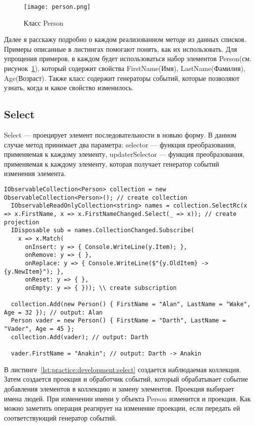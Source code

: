\begin{figure}[ht]
\centering
  \texttt{[image: person.png]}
  \caption{ Класс Person }
  \label{fig:person}
\end{figure}

Далее я расскажу подробно о каждом реализованном методе из данных списков.
Примеры описанные в листингах помогают понять, как их использовать.
Для упрощения примеров, в каждом будет использоваться набор элементов Person(см. рисунок~\ref{fig:person}), который содержит свойства FirstName(Имя), LastName(Фамилия), Age(Возраст).
Также класс содержит генераторы событий, которые позволяют узнать, когда и какое свойство изменилось.

\subsection{Select}
\label{sub:development:select}

Select --- проецирует элемент последовательности в новыю форму.
В данном случае метод принимает два параметра: selector --- функция преобразования,
применяемая к каждому элементу, updaterSelector --- функция преобразования,
применяемая к каждому элементу, которая получает генератор событий изменения элемента.

\begin{lstlisting}[style=csharpinlinestyle, caption={Пример использования Select}, label=lst:practice:development:select]
  IObservableCollection<Person> collection = new ObservableCollection<Person>(); // create collection
  IObservableReadOnlyCollection<string> names = collection.SelectRc(x => x.FirstName, x => x.FirstNameChanged.Select(_ => x)); // create projection
  IDisposable sub = names.CollectionChanged.Subscribe(
    x => x.Match(
      onInsert: y => { Console.WriteLine(y.Item); },
      onRemove: y => { },
      onReplace: y => { Console.WriteLine($"{y.OldItem} -> {y.NewItem}"); },
      onReset: y => { },
      onEmpty: y => { })); \\ create subscription

  collection.Add(new Person() { FirstName = "Alan", LastName = "Wake", Age = 32 }); // output: Alan
  Person vader = new Person() { FirstName = "Darth", LastName = "Vader", Age = 45 };
  collection.Add(vader); // output: Darth

  vader.FirstName = "Anakin"; // output: Darth -> Anakin
\end{lstlisting}

В листинге~\ref{lst:practice:development:select} создается наблюдаемая коллекция. Затем создается проекция и обработчик событий,
который обрабатывает событие добавления элементов в коллекцию и замену элементов.
Проекция выбирает имена людей. При изменении имени у объекта Person изменится и проекция.
Как можно заметить операция реагирует на изменение проекции, если передать ей соответствующий генератор событий.

